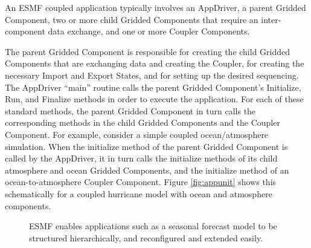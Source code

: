An ESMF coupled application typically involves an AppDriver, a parent 
Gridded Component, two or more child Gridded Components that require 
an inter-component data exchange, and one or more Coupler 
Components. 

The parent Gridded Component is responsible for creating the child 
Gridded Components that are exchanging data and creating the Coupler, 
for creating the necessary Import and Export States, and for 
setting up the desired sequencing.  The AppDriver ``main'' routine
calls the parent Gridded Component's Initialize, Run, and Finalize 
methods in order to execute the application.  For each of these
standard methods, the parent Gridded Component in turn calls the 
corresponding methods in the child Gridded Components and the 
Coupler Component.  For example, consider a simple coupled 
ocean/atmosphere simulation.  When the initialize method of the 
parent Gridded Component is called by the AppDriver, it in turn 
calls the initialize methods of its child atmosphere and ocean 
Gridded Components, and the initialize method of an 
ocean-to-atmosphere Coupler Component.  Figure \ref{fig:appunit}
shows this schematically for a coupled hurricane model with ocean
and atmosphere components.

\begin{center}
\begin{figure}
\caption{ESMF enables applications such as a seasonal forecast
model to be structured hierarchically, and reconfigured and 
extended easily.}
\label{fig:tree}
\end{figure}
\end{center}

